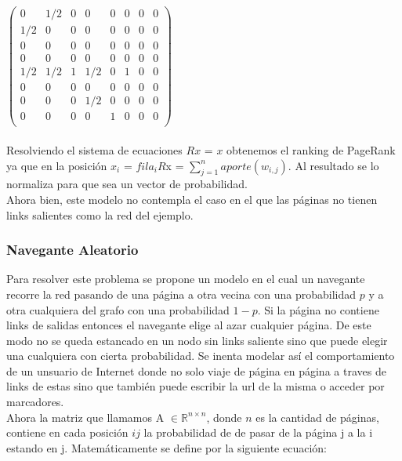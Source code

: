 $ \begin{pmatrix}
  0 & 1/2 & 0 & 0 & 0 & 0 & 0 & 0 \\
 1/2 & 0 & 0 & 0 & 0 & 0 & 0 & 0  \\
  0 & 0 & 0 & 0 & 0 & 0 & 0 & 0  \\
   0 & 0 & 0 & 0 & 0 & 0 & 0 & 0  \\
    1/2 & 1/2 & 1 & 1/2 & 0 & 1 & 0 & 0  \\
     0 & 0 & 0 & 0 & 0 & 0 & 0 & 0  \\
      0 & 0 & 0 & 1/2 & 0 & 0 & 0 & 0  \\
       0 & 0 & 0 & 0 & 1 & 0 & 0 & 0  \\
 \end{pmatrix}$ \\ \\


Resolviendo el sistema de ecuaciones $Rx$ = $x$ obtenemos el ranking de PageRank ya que en la posición $x_{i}$ = $fila_{i} R$x = $\sum_{j=1}^{n} aporte (w_{i,j})$. Al resultado se lo normaliza para que sea un vector de probabilidad. \\

Ahora bien, este modelo no contempla el caso en el que las páginas no tienen links salientes como la red del ejemplo. 

\subsubsection{Navegante Aleatorio}

Para resolver este problema se propone un modelo en el cual un navegante recorre la red pasando de una página a otra vecina con una probabilidad $p$ y a otra cualquiera del grafo con una probabilidad $1-p$. Si la página no contiene links de salidas entonces el navegante elige al azar cualquier página. De este modo no se queda estancado en un nodo sin links saliente sino que puede elegir una cualquiera con cierta probabilidad. Se inenta modelar así el comportamiento de un unsuario de Internet donde no solo viaje de página en página a traves de links de estas sino que también puede escribir la url de la misma o acceder por marcadores. \\

Ahora la matriz que llamamos A $\in \mathbb{R}^{n \times n}$, donde $n$ es la cantidad de páginas, contiene en cada posición $ij$ la probabilidad de de pasar de la página j a la i estando en j. Matemáticamente se define por la siguiente ecuación:

